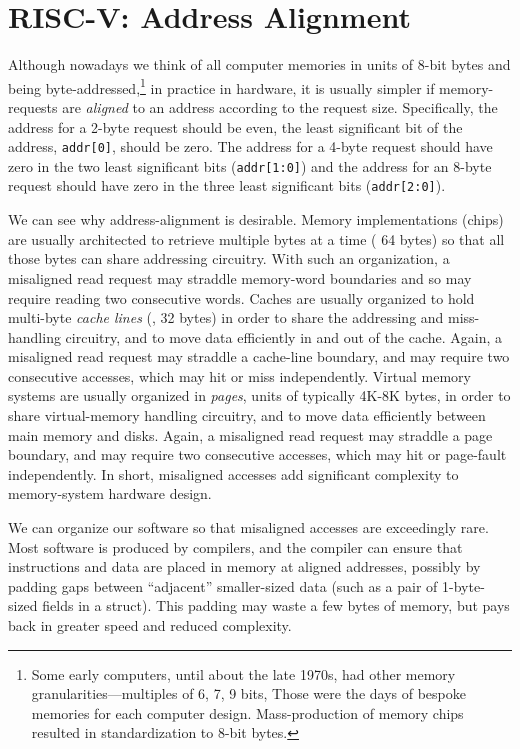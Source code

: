 
\section{RISC-V: Address Alignment}


Although nowadays we think of all computer memories in units of 8-bit
bytes and being byte-addressed,\footnote{Some early computers, until
about the late 1970s, had other memory granularities---multiples of 6,
7, 9 bits, {\etc} Those were the days of bespoke memories for each
computer design.  Mass-production of memory chips resulted in
standardization to 8-bit bytes.} in practice in hardware, it is
usually simpler if memory-requests are \emph{aligned} to an address
according to the request size.  Specifically, the address for a 2-byte
request should be even, {\ie} the least significant bit of the
address, \verb|addr[0]|, should be zero.  The address for a 4-byte
request should have zero in the two least significant bits
(\verb|addr[1:0]|) and the address for an 8-byte request should have
zero in the three least significant bits (\verb|addr[2:0]|).

We can see why address-alignment is desirable.  Memory implementations
(chips) are usually architected to retrieve multiple bytes at a time
({\eg} 64 bytes) so that all those bytes can share addressing
circuitry.  With such an organization, a misaligned read request may
straddle memory-word boundaries and so may require reading two
consecutive words.  Caches are usually organized to hold multi-byte
\emph{cache lines} ({\eg}, 32 bytes) in order to share the addressing
and miss-handling circuitry, and to move data efficiently in and out
of the cache.  Again, a misaligned read request may straddle a
cache-line boundary, and may require two consecutive accesses, which
may hit or miss independently.  Virtual memory systems are usually
organized in \emph{pages}, units of typically 4K-8K bytes, in order to
share virtual-memory handling circuitry, and to move data efficiently
between main memory and disks.  Again, a misaligned read request may
straddle a page boundary, and may require two consecutive accesses,
which may hit or page-fault independently.  In short, misaligned
accesses add significant complexity to memory-system hardware design.

We can organize our software so that misaligned accesses are
exceedingly rare.  Most software is produced by compilers, and the
compiler can ensure that instructions and data are placed in memory at
aligned addresses, possibly by padding gaps between ``adjacent''
smaller-sized data (such as a pair of 1-byte-sized fields in a
struct).  This padding may waste a few bytes of memory, but pays back
in greater speed and reduced complexity.

